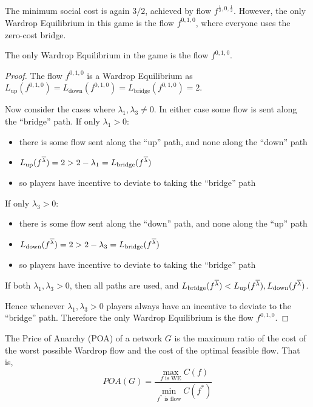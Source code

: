 The minimum social cost is again $3/2$, achieved by flow $f^{\frac{1}{2}, 0,
\frac{1}{2}}$. However, the only Wardrop Equilibrium in this game is the flow
$f^{0,1,0}$, where everyone uses the zero-cost bridge.

\begin{claim}
	The only Wardrop Equilibrium in the game is the flow $f^{0,1,0}$.
\end{claim}
\begin{proof}
	The flow $f^{0,1,0}$ is a Wardrop Equilibrium as $L_\text{up}(f^{0,1,0}) =
	L_\text{down}(f^{0,1,0}) = L_\text{bridge}(f^{0,1,0}) = 2$.

	Now consider the cases where $\lambda_1, \lambda_3 \neq 0$. In either case
	some flow is sent along the ``bridge'' path. If only $\lambda_1 > 0$:
	\begin{itemize}
		\item there is some flow sent along the ``up'' path, and none along the
			``down'' path
		\item $L_\text{up}(f^{\overline{\lambda}}) = 2 > 2 - \lambda_1 =
			L_\text{bridge}(f^{\overline{\lambda}})$
		\item so players have incentive to deviate to taking the ``bridge''
			path
	\end{itemize}

	If only $\lambda_3 > 0$:
	\begin{itemize}
		\item there is some flow sent along the ``down'' path, and none along the
			``up'' path
		\item $L_\text{down}(f^{\overline{\lambda}}) = 2 > 2 - \lambda_3 =
			L_\text{bridge}(f^{\overline{\lambda}})$
		\item so players have incentive to deviate to taking the ``bridge''
			path
	\end{itemize}

	If both $\lambda_1, \lambda_3 > 0$, then all paths are used, and
	$L_\text{bridge}(f^{\overline{\lambda}}) < L_\text{up}(f^{\overline{\lambda}}),
	L_\text{down}(f^{\overline{\lambda}})$.

	Hence whenever $\lambda_1, \lambda_3 > 0$ players always have an incentive
	to deviate to the ``bridge'' path. Therefore the only Wardrop Equilibrium
	is the flow $f^{0,1,0}$.

\end{proof}

\begin{definition}
	The Price of Anarchy (POA) of a network $G$ is the maximum ratio of
	the cost of the worst possible Wardrop flow and the cost of the optimal
	feasible flow. That is,
	\begin{equation}
		POA(G) = \frac{ \max_{f \text{ is WE}} C(f) }{ \min_{f^* \text{ is
		flow}} C(f^*) }
	\end{equation}
\end{definition}

